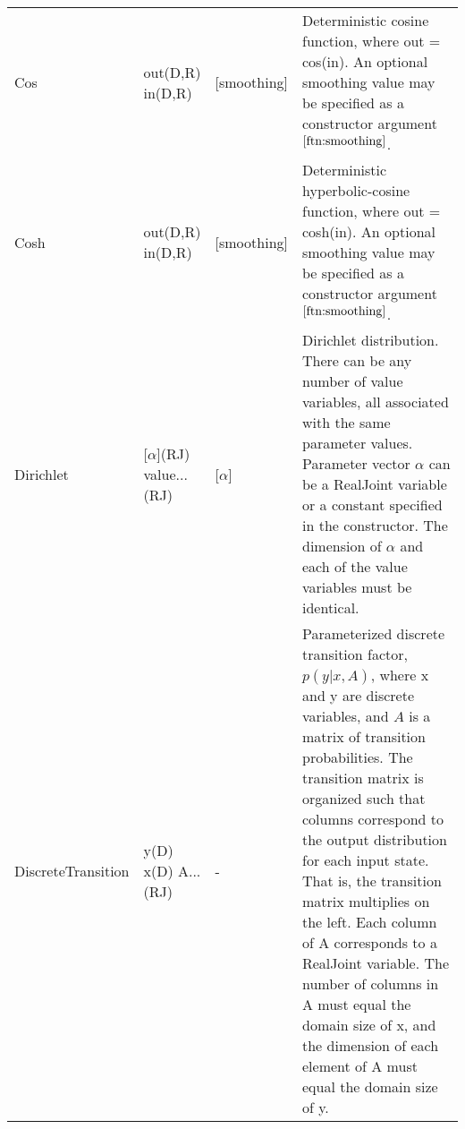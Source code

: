 \begin{longtable} {p{3.5cm} p{2.2cm} p{2cm} p{7cm}}
%
Cos & out(D,R) \newline in(D,R) & [smoothing] & Deterministic cosine function, where out = cos(in). An optional smoothing value may be specified as a constructor argument$^{\ref{ftn:smoothing}}$. \\
%
Cosh & out(D,R) \newline in(D,R) & [smoothing] & Deterministic hyperbolic-cosine function, where out = cosh(in). An optional smoothing value may be specified as a constructor argument$^{\ref{ftn:smoothing}}$. \\
%
Dirichlet & [$\alpha$](RJ) \newline value...(RJ) & [$\alpha$] & Dirichlet distribution.  There can be any number of value variables, all associated with the same parameter values.  Parameter vector $\alpha$ can be a RealJoint variable or a constant specified in the constructor.  The dimension of $\alpha$ and each of the value variables must be identical. \\
%
DiscreteTransition & y(D) \newline x(D) \newline A...(RJ) & - & 
Parameterized discrete transition factor, $p(y | x, A)$, where x and y are discrete variables, and $A$ is a matrix of transition probabilities. The transition matrix is organized such that columns correspond to the output distribution for each input state. That is, the transition matrix multiplies on the left. Each column of A corresponds to a RealJoint variable. The number of columns in A must equal the domain size of x, and the dimension of each element of A  must equal the domain size of y. \newline

\end{longtable}
